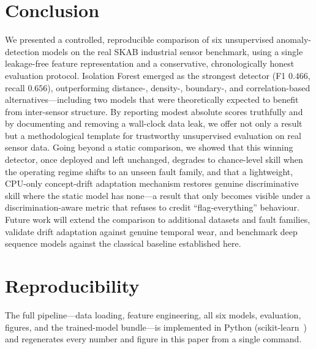 \documentclass[conference]{IEEEtran}
\begin{document}
\section{Conclusion}
\label{sec:conclusion}
We presented a controlled, reproducible comparison of six unsupervised
anomaly-detection models on the real SKAB industrial sensor benchmark, using a
single leakage-free feature representation and a conservative, chronologically
honest evaluation protocol. Isolation Forest emerged as the strongest detector
(F1 $0.466$, recall $0.656$), outperforming distance-, density-, boundary-, and
correlation-based alternatives---including two models that were theoretically
expected to benefit from inter-sensor structure. By reporting modest absolute
scores truthfully and by documenting and removing a wall-clock data leak, we
offer not only a result but a methodological template for trustworthy
unsupervised evaluation on real sensor data. Going beyond a static comparison,
we showed that this winning detector, once deployed and left unchanged, degrades
to chance-level skill when the operating regime shifts to an unseen fault
family, and that a lightweight, CPU-only concept-drift adaptation mechanism
restores genuine discriminative skill where the static model has none---a result
that only becomes visible under a discrimination-aware metric that refuses to
credit ``flag-everything'' behaviour. Future work will extend the comparison to
additional datasets and fault families, validate drift adaptation against
genuine temporal wear, and benchmark deep sequence models against the classical
baseline established here.

\section*{Reproducibility}
The full pipeline---data loading, feature engineering, all six models,
evaluation, figures, and the trained-model bundle---is implemented in Python
(scikit-learn~\cite{pedregosa2011}) and regenerates every number and figure in
this paper from a single command.
\end{document}
